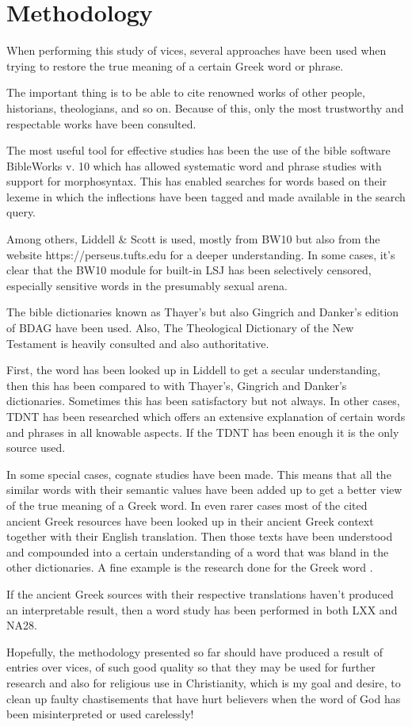 \section{Methodology}

When performing this study of vices, several approaches have been used
when trying to restore the true meaning of a certain Greek word or phrase.

The important thing is to be able to cite renowned works of other people,
historians, theologians, and so on. Because of this, only the most trustworthy
and respectable works have been consulted.

The most useful tool for effective studies has been the use of the bible software
BibleWorks v. 10 which has allowed systematic word and phrase studies with support
for morphosyntax. This has enabled searches for words based on their lexeme in which
the inflections have been tagged and made available in the search query.
 
Among others, Liddell \& Scott is used, mostly from BW10 but also from the
website https://perseus.tufts.edu for a deeper understanding. In some cases,
it's clear that the BW10 module for built-in LSJ has been selectively censored,
especially sensitive words in the presumably sexual arena.

The bible dictionaries known as Thayer's but also Gingrich and Danker's edition
of BDAG have been used. Also, The Theological Dictionary of the New Testament is 
heavily consulted and also authoritative.

First, the word has been looked up in Liddell to get a secular understanding,
then this has been compared to with Thayer's, Gingrich and Danker's dictionaries.
Sometimes this has been satisfactory but not always. In other cases, TDNT
has been researched which offers an extensive explanation of certain words and
phrases in all knowable aspects. If the TDNT has been enough it is the only source used.

In some special cases, cognate studies have been made. This means that all
the similar words with their semantic values have been added up to get a
better view of the true meaning of a Greek word. In even rarer cases most
of the cited ancient Greek resources have been looked up in their ancient
Greek context together with their English translation. Then those texts
have been understood and compounded into a certain understanding of a word
that was bland in the other dictionaries. A fine example is the research done
for the Greek word .

If the ancient Greek sources with their respective translations haven't produced
an interpretable result, then a word study has been performed in both LXX and NA28.

Hopefully, the methodology presented so far should have produced a result of 
entries over vices, of such good quality so that they may be used for further research
and also for religious use in Christianity, which is my goal and desire, to clean
up faulty chastisements that have hurt believers when the word of God has been
misinterpreted or used carelessly!
